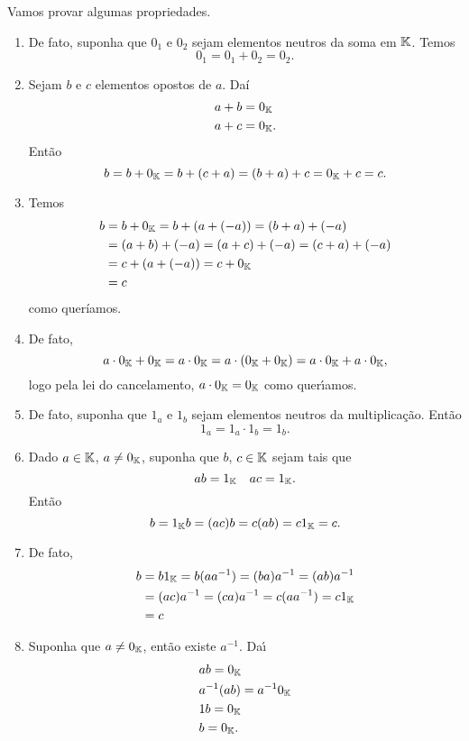 \begin{prova}
	Vamos provar algumas propriedades.
	\begin{enumerate}[label={\roman*})]
		\item De fato, suponha que $0_1$ e $0_2$ sejam elementos neutros da soma em $\mathbb{K}$. Temos
		\[
			0_1 = 0_1 + 0_2 = 0_2.
		\]
	
		\item Sejam $b$ e $c$ elementos opostos de $a$. Daí
		\begin{align*}
			a + b &= 0_{\mathbb{K}}\\
			a + c &= 0_{\mathbb{K}}.
		\end{align*}
	 	Ent\~ao
		\[
			b = b + 0_{\mathbb{K}} = b + (c + a) = (b + a) + c = 0_{\mathbb{K}} + c = c.
		\]
		
		\item Temos
		\begin{align*}
			b &= b + 0_{\mathbb{K}} = b + (a + (-a)) = (b + a) + (-a) \\ &= (a + b) + (-a) = (a + c) + (-a) = (c + a) + (-a) \\ &= c + (a + (-a)) = c + 0_{\mathbb{K}} \\ &= c
		\end{align*}
		como queríamos.
	
		\item De fato,
		\[
			a\cdot 0_{\mathbb{K}} + 0_{\mathbb{K}} = a\cdot 0_{\mathbb{K}} = a\cdot (0_{\mathbb{K}} + 0_{\mathbb{K}}) = a\cdot 0_{\mathbb{K}} + a\cdot 0_{\mathbb{K}},
		\]
		logo pela lei do cancelamento, $a\cdot 0_{\mathbb{K}} = 0_{\mathbb{K}}$ como quer{\'\i}amos.
	
	
		\item
		De fato, suponha que $1_a$ e $1_b$ sejam elementos neutros da multiplica\c{c}\~ao. Ent\~ao
		\[
			1_a = 1_a\cdot 1_b = 1_b.
		\]
	
		\item Dado $a \in \mathbb{K}$, $a \ne 0_{\mathbb{K}}$, suponha que $b$, $c \in \mathbb{K}$ sejam tais que
		\[
			ab = 1_{\mathbb{K}} \quad ac = 1_{\mathbb{K}}.
		\]
		Ent\~ao
		\[
			b = 1_{\mathbb{K}}b = (ac)b = c(ab) = c1_{\mathbb{K}} = c.
		\]
		
		\item De fato,
		\begin{align*}
			b &= b1_{\mathbb{K}} = b(aa^{-1}) = (ba)a^{-1} = (ab)a^{-1} \\ &= (ac)a^{-1} = (ca)a^{-1} = c(aa^{-1}) = c1_{\mathbb{K}} \\ &= c
		\end{align*}
	
		\item
		Suponha que $a \ne 0_{\mathbb{K}}$, ent\~ao existe $a^{-1}$. Da{\'\i}
		\begin{align*}
			&ab = 0_{\mathbb{K}}\\
			&a^{-1}(ab) = a^{-1}0_{\mathbb{K}}\\
			&1b = 0_{\mathbb{K}}\\
			&b = 0_{\mathbb{K}}.
		\end{align*}
	\end{enumerate}
\end{prova}


